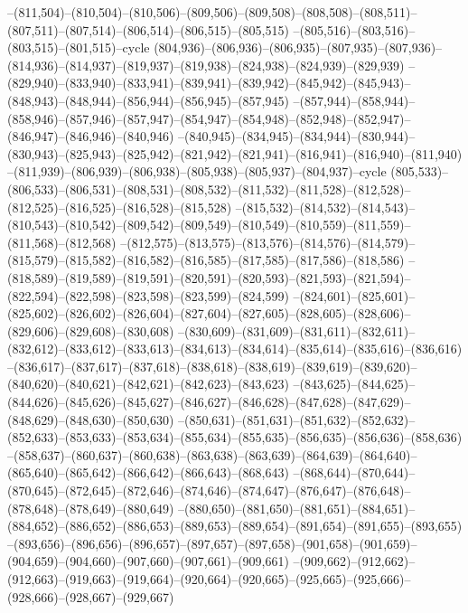 --(811,504)--(810,504)--(810,506)--(809,506)--(809,508)--(808,508)--(808,511)--(807,511)--(807,514)--(806,514)--(806,515)--(805,515)
--(805,516)--(803,516)--(803,515)--(801,515)--cycle
(804,936)--(806,936)--(806,935)--(807,935)--(807,936)--(814,936)--(814,937)--(819,937)--(819,938)--(824,938)--(824,939)--(829,939)
--(829,940)--(833,940)--(833,941)--(839,941)--(839,942)--(845,942)--(845,943)--(848,943)--(848,944)--(856,944)--(856,945)--(857,945)
--(857,944)--(858,944)--(858,946)--(857,946)--(857,947)--(854,947)--(854,948)--(852,948)--(852,947)--(846,947)--(846,946)--(840,946)
--(840,945)--(834,945)--(834,944)--(830,944)--(830,943)--(825,943)--(825,942)--(821,942)--(821,941)--(816,941)--(816,940)--(811,940)
--(811,939)--(806,939)--(806,938)--(805,938)--(805,937)--(804,937)--cycle
(805,533)--(806,533)--(806,531)--(808,531)--(808,532)--(811,532)--(811,528)--(812,528)--(812,525)--(816,525)--(816,528)--(815,528)
--(815,532)--(814,532)--(814,543)--(810,543)--(810,542)--(809,542)--(809,549)--(810,549)--(810,559)--(811,559)--(811,568)--(812,568)
--(812,575)--(813,575)--(813,576)--(814,576)--(814,579)--(815,579)--(815,582)--(816,582)--(816,585)--(817,585)--(817,586)--(818,586)
--(818,589)--(819,589)--(819,591)--(820,591)--(820,593)--(821,593)--(821,594)--(822,594)--(822,598)--(823,598)--(823,599)--(824,599)
--(824,601)--(825,601)--(825,602)--(826,602)--(826,604)--(827,604)--(827,605)--(828,605)--(828,606)--(829,606)--(829,608)--(830,608)
--(830,609)--(831,609)--(831,611)--(832,611)--(832,612)--(833,612)--(833,613)--(834,613)--(834,614)--(835,614)--(835,616)--(836,616)
--(836,617)--(837,617)--(837,618)--(838,618)--(838,619)--(839,619)--(839,620)--(840,620)--(840,621)--(842,621)--(842,623)--(843,623)
--(843,625)--(844,625)--(844,626)--(845,626)--(845,627)--(846,627)--(846,628)--(847,628)--(847,629)--(848,629)--(848,630)--(850,630)
--(850,631)--(851,631)--(851,632)--(852,632)--(852,633)--(853,633)--(853,634)--(855,634)--(855,635)--(856,635)--(856,636)--(858,636)
--(858,637)--(860,637)--(860,638)--(863,638)--(863,639)--(864,639)--(864,640)--(865,640)--(865,642)--(866,642)--(866,643)--(868,643)
--(868,644)--(870,644)--(870,645)--(872,645)--(872,646)--(874,646)--(874,647)--(876,647)--(876,648)--(878,648)--(878,649)--(880,649)
--(880,650)--(881,650)--(881,651)--(884,651)--(884,652)--(886,652)--(886,653)--(889,653)--(889,654)--(891,654)--(891,655)--(893,655)
--(893,656)--(896,656)--(896,657)--(897,657)--(897,658)--(901,658)--(901,659)--(904,659)--(904,660)--(907,660)--(907,661)--(909,661)
--(909,662)--(912,662)--(912,663)--(919,663)--(919,664)--(920,664)--(920,665)--(925,665)--(925,666)--(928,666)--(928,667)--(929,667)
